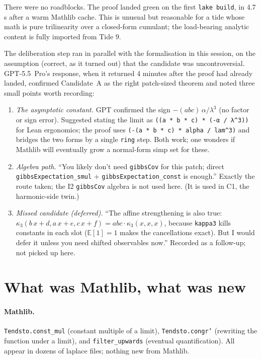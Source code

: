 \documentclass[11pt]{article}
\begin{document}
There were no roadblocks. The proof landed green on the first
\texttt{lake build}, in 4.7\,s after a warm Mathlib cache. This is
unusual but reasonable for a tide whose math is pure trilinearity over
a closed-form cumulant; the load-bearing analytic content is fully
imported from Tide 9.

The deliberation step ran in parallel with the formalisation in this
session, on the assumption (correct, as it turned out) that the
candidate was uncontroversial. GPT-5.5~Pro's response, when it
returned 4 minutes after the proof had already landed, confirmed
Candidate~A as the right patch-sized theorem and noted three small
points worth recording:

\begin{enumerate}
\item \emph{The asymptotic constant.} GPT confirmed the sign
  $-(abc)\,\alpha/\lambda^3$ (no factor or sign error). Suggested
  stating the limit as \texttt{((a * b * c) * (-α / λ\^{}3))} for
  Lean ergonomics; the proof uses
  \texttt{(-(a * b * c) * alpha / lam\^{}3)} and bridges the two
  forms by a single \texttt{ring} step. Both work; one wonders if
  Mathlib will eventually grow a normal-form simp set for these.
\item \emph{Algebra path.} ``You likely don't need \texttt{gibbsCov}
  for this patch; direct \texttt{gibbsExpectation\_smul} +
  \texttt{gibbsExpectation\_const} is enough.'' Exactly the route
  taken; the I2 \texttt{gibbsCov} algebra is not used here. (It is
  used in C1, the harmonic-side twin.)
\item \emph{Missed candidate (deferred).} ``The affine
  strengthening is also true:
  $\kappa_3(b\,x + d, a\,x + e, c\,x + f) = abc \cdot \kappa_3(x, x, x)$,
  because \texttt{kappa3} kills constants in each slot
  ($\mathbb{E}[1] = 1$ makes the cancellations exact). But I would
  defer it unless you need shifted observables now.'' Recorded as a
  follow-up; not picked up here.
\end{enumerate}

\section{What was Mathlib, what was new}

\paragraph{Mathlib.} \texttt{Tendsto.const\_mul} (constant multiple of
a limit), \texttt{Tendsto.congr'} (rewriting the function under a
limit), and \texttt{filter\_upwards} (eventual quantification). All
appear in dozens of laplace files; nothing new from Mathlib.
\end{document}
